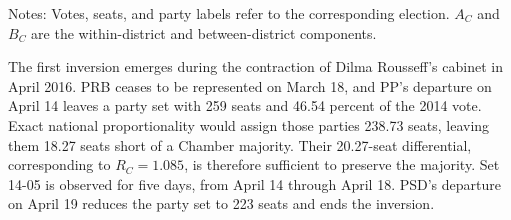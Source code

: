 \documentclass[11pt]{article}
\begin{document}

\begin{table}[htbp]
\centering
\caption{Inverted cabinet party sets and their district components}
\label{tab:cabinet-inversions}
\footnotesize
\setlength{\tabcolsep}{2pt}
\renewcommand{\arraystretch}{1.06}

\begin{flushleft}
\footnotesize Notes: Votes, seats, and party labels refer to the
corresponding election. \(A_C\) and \(B_C\) are the within-district
and between-district components.
\end{flushleft}
\end{table}


The first inversion emerges during the contraction of Dilma Rousseff's
cabinet in April 2016. PRB ceases to be represented on March 18, and PP's
departure on April 14 leaves a party set with 259 seats and 46.54 percent
of the 2014 vote. Exact national proportionality would assign those
parties 238.73 seats, leaving them 18.27 seats short of a Chamber majority.
Their 20.27-seat differential, corresponding to \(R_C=1.085\), is
therefore sufficient to preserve the majority. Set 14-05 is observed for five days, from April 14 through April 18. PSD's departure
on April 19 reduces the party set to 223 seats and ends the inversion.

\end{document}

